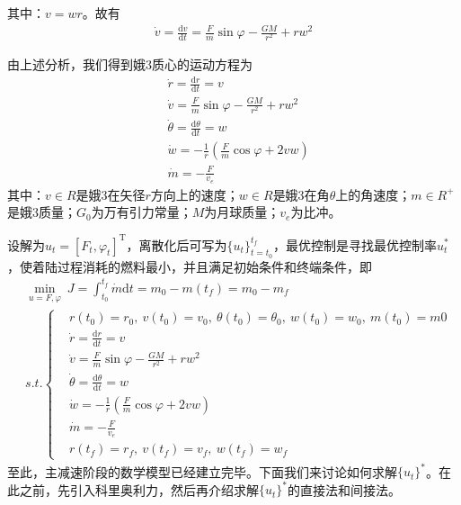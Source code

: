             其中：$v= wr$。故有
            \begin{align*}
            \dot{v} = \frac{\mathrm{d}v}{\mathrm{d}t} = \frac{F}{m}\sin \varphi - \frac{GM}{r^2}+rw^2
            \end{align*}
            \par
            由上述分析，我们得到娥3质心的运动方程为
            \begin{align*}
            & \dot{r} = \frac{\mathrm{d}r}{\mathrm{d}t} = v\\
            & \dot{v} = \frac{F}{m}\sin\varphi - \frac{GM}{r^2}+rw^2\\
            & \dot{\theta} = \frac{\mathrm{d}\theta}{\mathrm{d}t} = w\\
            & \dot{w} = -\frac{1}{r}(\frac{F}{m}\cos\varphi+2vw)\\
            & \dot{m} = -\frac{F}{v_e}
            \end{align*}
            其中：$v\in R$是娥3在矢径$r$方向上的速度；$w\in R$是娥3在角$\theta$上的角速度；$m\in R^+$是娥3质量；$G_0$为万有引力常量；$M$为月球质量；$v_e$为比冲。
            \par
            设解为$u_t = [F_t,\varphi_t]^\mathrm{T}$，离散化后可写为$\{u_t\}_{t=t_0}^{t_f}$，最优控制是寻找最优控制率$u_t^*$，使着陆过程消耗的燃料最小，并且满足初始条件和终端条件，即
            \begin{align*}
            &\min_{u=F,\varphi}\  J = \int_{t_0}^{t_f} \dot{m}\mathrm{d}t= m_0 - m(t_f) = m_0-m_f\\
            &s.t.\left\{
            \begin{aligned}
            &r(t_0) = r_0,\ v(t_0) = v_0,\ \theta(t_0) = \theta_0,\ w(t_0) = w_0,\ m(t_0) = m0\\
            & \dot{r} = \frac{\mathrm{d}r}{\mathrm{d}t} = v\\
            & \dot{v} = \frac{F}{m}\sin\varphi - \frac{GM}{r^2}+rw^2\\
            & \dot{\theta} = \frac{\mathrm{d}\theta}{\mathrm{d}t} = w\\
            & \dot{w} = -\frac{1}{r}(\frac{F}{m}\cos\varphi+2vw)\\
            & \dot{m} = -\frac{F}{v_e}\\
            & r(t_f) = r_f,\ v(t_f) = v_f,\ w(t_f) = w_f
            \end{aligned}
            \right.
            \end{align*}
            至此，主减速阶段的数学模型已经建立完毕。下面我们来讨论如何求解$\{u_t\}^*$。在此之前，先引入科里奥利力，然后再介绍求解$\{u_t\}^*$的直接法和间接法。
